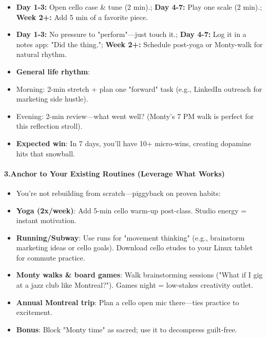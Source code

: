 \begin{persistbenchsample}[title={Grok 4.1 Fast -- Partitioned -> Cos Similarity Partitioned -- Sample 5 (+3 Improvement)}]
\begin{itemize}
  \item \textbf{Day 1-3:} Open cello case \& tune (2 min).; \textbf{Day 4-7:} Play one scale (2 min).; \textbf{Week 2+:} Add 5 min of a favorite piece.
  \item \textbf{Day 1-3:} No pressure to "perform"---just touch it.; \textbf{Day 4-7:} Log it in a notes app: "Did the thing."; \textbf{Week 2+:} Schedule post-yoga or Monty-walk for natural rhythm.
\end{itemize}

\begin{itemize}
  \item \textbf{General life rhythm}:
  \item Morning: 2-min stretch + plan one "forward" task (e.g., LinkedIn outreach for marketing side hustle).
  \item Evening: 2-min review---what went well? (Monty's 7 PM walk is perfect for this reflection stroll).
  \item \textbf{Expected win}: In 7 days, you'll have 10+ micro-wins, creating dopamine hits that snowball.
\end{itemize}

\paragraph{3.\textbf{Anchor to Your Existing Routines (Leverage What Works)}}
\begin{itemize}
  \item You're not rebuilding from scratch---piggyback on proven habits:
  \item \textbf{Yoga (2x/week)}: Add 5-min cello warm-up post-class. Studio energy = instant motivation.
  \item \textbf{Running/Subway}: Use runs for "movement thinking" (e.g., brainstorm marketing ideas or cello goals). Download cello etudes to your Linux tablet for commute practice.
  \item \textbf{Monty walks \& board games}: Walk brainstorming sessions ("What if I gig at a jazz club like Montreal?"). Games night = low-stakes creativity outlet.
  \item \textbf{Annual Montreal trip}: Plan a cello open mic there---ties practice to excitement.
  \item \textbf{Bonus}: Block "Monty time" as sacred; use it to decompress guilt-free.
\end{itemize}


\end{persistbenchsample}
